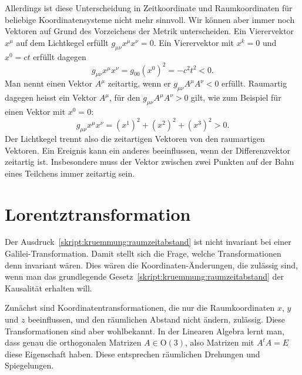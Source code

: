 Allerdings ist diese Unterscheidung in Zeitkoordinate und Raumkoordinaten
für beliebige Koordinatensysteme nicht mehr sinnvoll.
Wir können aber immer noch Vektoren auf Grund des Vorzeichens der 
Metrik unterscheiden.
Ein Vierervektor $x^\mu$ auf dem Lichtkegel erfüllt $g_{\mu\nu}x^\mu x^\nu=0$.
Ein Vierervektor  mit $x^k=0$ und $x^0=ct$ erfüllt dagegen
\[
g_{\mu\nu} x^\mu x^\nu
=
g_{00}(x^0)^2 = -c^2 t^2<0.
\]
Man nennt einen Vektor $A^\mu$ zeitartig, wenn er $g_{\mu\nu}A^\mu A^\nu<0$ 
erfüllt.
Raumartig dagegen heisst ein Vektor $A^\mu$, für den
$g_{\mu\nu} A^\mu A^\nu>0$
gilt, wie zum Beispiel für einen Vektor mit $x^0=0$:
\[
g_{\mu\nu}x^\mu x^\nu
=
(x^1)^2
+
(x^2)^2
+
(x^3)^2
>0.
\]
Der Lichtkegel trennt also die zeitartigen Vektoren von den raumartigen
Vektoren.
Ein Ereignis kann ein anderes beeinflussen, wenn der Differenzvektor
zeitartig ist.
Insbesondere muss der Vektor zwischen zwei Punkten auf der Bahn 
eines Teilchens immer zeitartig sein.

\section{Lorentztransformation}
Der Ausdruck~\eqref{skript:kruemmung:raumzeitabstand} ist nicht
invariant bei einer Galilei-Transformation.
Damit stellt sich die Frage, welche Transformationen denn
invariant wären.
Dies wären die Koordinaten-Änderungen, die zulässig sind, wenn
man das grundlegende Gesetz~\eqref{skript:kruemmung:raumzeitabstand}
der Kausalität erhalten will.

Zunächst sind Koordinatentransformationen, die nur die Raumkoordinaten
$x$, $y$ und $z$ beeinflussen, und den räumlichen Abstand nicht
ändern, zulässig.
Diese Transformationen sind aber wohlbekannt.
In der Linearen Algebra lernt man, dass genau die orthogonalen
Matrizen $A\in \textrm{O}(3)$, also Matrizen mit $A^tA=E$ diese
Eigenschaft haben.
Diese entsprechen räumlichen Drehungen und Spiegelungen.


